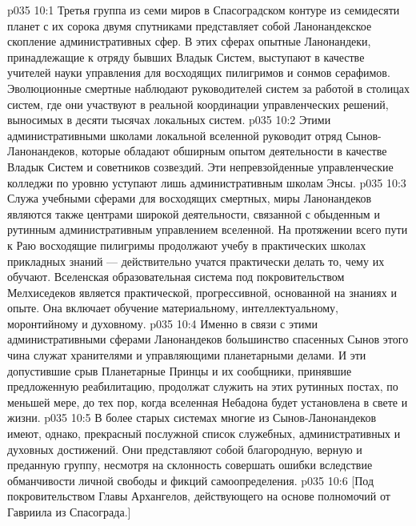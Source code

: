 \vs p035 10:1 Третья группа из семи миров в Спасоградском контуре из семидесяти планет с их сорока двумя спутниками представляет собой Ланонандекское скопление административных сфер. В этих сферах опытные Ланонандеки, принадлежащие к отряду бывших Владык Систем, выступают в качестве учителей науки управления для восходящих пилигримов и сонмов серафимов. Эволюционные смертные наблюдают руководителей систем за работой в столицах систем, где они участвуют в реальной координации управленческих решений, выносимых в десяти тысячах локальных систем.
\vs p035 10:2 Этими административными школами локальной вселенной руководит отряд Сынов\hyp{}Ланонандеков, которые обладают обширным опытом деятельности в качестве Владык Систем и советников созвездий. Эти непревзойденные управленческие колледжи по уровню уступают лишь административным школам Энсы.
\vs p035 10:3 Служа учебными сферами для восходящих смертных, миры Ланонандеков являются также центрами широкой деятельности, связанной с обыденным и рутинным административным управлением вселенной. На протяжении всего пути к Раю восходящие пилигримы продолжают учебу в практических школах прикладных знаний --- действительно учатся практически делать то, чему их обучают. Вселенская образовательная система под покровительством Мелхиседеков является практической, прогрессивной, основанной на знаниях и опыте. Она включает обучение материальному, интеллектуальному, моронтийному и духовному.
\vs p035 10:4 \pc Именно в связи с этими административными сферами Ланонандеков большинство спасенных Сынов этого чина служат хранителями и управляющими планетарными делами. И эти допустившие срыв Планетарные Принцы и их сообщники, принявшие предложенную реабилитацию, продолжат служить на этих рутинных постах, по меньшей мере, до тех пор, когда вселенная Небадона будет установлена в свете и жизни.
\vs p035 10:5 \pc В более старых системах многие из Сынов\hyp{}Ланонандеков имеют, однако, прекрасный послужной список служебных, административных и духовных достижений. Они представляют собой благородную, верную и преданную группу, несмотря на склонность совершать ошибки вследствие обманчивости личной свободы и фикций самоопределения.
\vsetoff
\vs p035 10:6 [Под покровительством Главы Архангелов, действующего на основе полномочий от Гавриила из Спасограда.]
